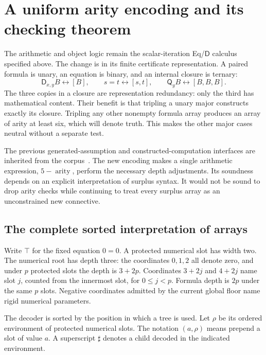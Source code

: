 \documentclass[11pt,letterpaper]{article}
\theoremstyle{definition}\newtheorem{definition}[theorem]{Definition}
\theoremstyle{remark}\newtheorem{remark}[theorem]{Remark}
\newcommand{\D}{\mathsf D}
\newcommand{\Q}{\mathsf Q}
\begin{document}
\section{A uniform arity encoding and its checking theorem}
\label{sec:arity-checker}

The arithmetic and object logic remain the scalar-iteration Eq/$\D$
calculus specified above.  The change is in its finite certificate
representation.  A paired formula is unary, an equation is binary, and
an internal closure is ternary:
\[
 \D_{x,y}B\longleftrightarrow[B],\qquad
 s=t\longleftrightarrow[s,t],\qquad
 \Q_yB\longleftrightarrow[B,B,B].
 \tag{Arity encoding}\label{eq:arity-encoding}
\]
The three copies in a closure are representation redundancy: only the
third has mathematical content.  Their benefit is that tripling a unary
major constructs exactly its closure.  Tripling any other nonempty
formula array produces an array of arity at least six, which will denote
truth.  This makes the other major cases neutral without a separate
test.

The previous generated-assumption and constructed-computation interfaces
are inherited from the corpus~\cite{generated,constructed}.  The new
encoding makes a single arithmetic expression, $5-\operatorname{arity}$,
perform the necessary depth adjustments.  Its soundness depends on an
explicit interpretation of surplus syntax.  It would not be sound to
drop arity checks while continuing to treat every surplus array as an
unconstrained new connective.

\subsection{The complete sorted interpretation of arrays}
\label{subsec:sorted-arrays}

Write $\top$ for the fixed equation $0=0$.  A protected numerical slot
has width two.  The numerical root has depth three: the coordinates
$0,1,2$ all denote zero, and under $p$ protected slots the depth is
$3+2p$.  Coordinates $3+2j$ and $4+2j$ name slot $j$, counted from
the innermost slot, for $0\leq j<p$.  Formula depth is $2p$ under the
same $p$ slots.  Negative coordinates admitted by the current global
floor name rigid numerical parameters.

The decoder is sorted by the position in which a tree is used.  Let
$\rho$ be its ordered environment of protected numerical slots.
The notation $(a,\rho)$ means prepend a slot of value $a$.
A superscript $\sharp$ denotes a child decoded in the indicated
environment.
\end{document}
